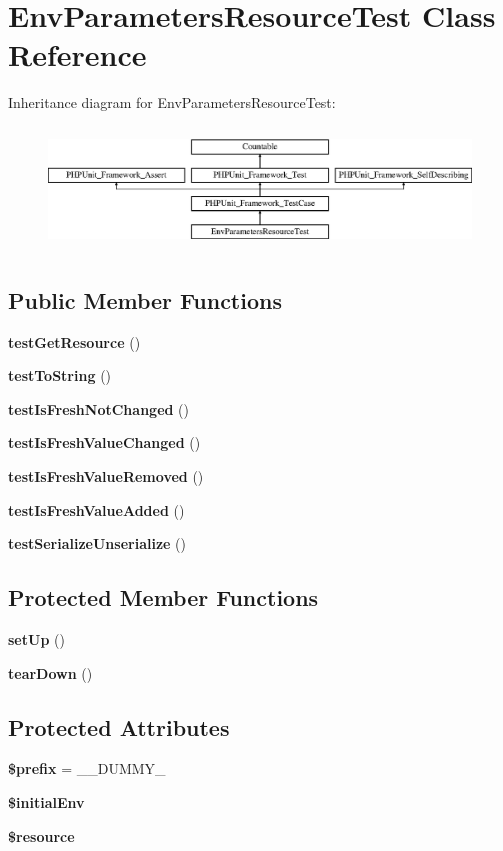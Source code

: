 \section{Env\+Parameters\+Resource\+Test Class Reference}
\label{class_symfony_1_1_component_1_1_http_kernel_1_1_tests_1_1_config_1_1_env_parameters_resource_test}
Inheritance diagram for Env\+Parameters\+Resource\+Test\+:\begin{figure}[H]
\begin{center}
\leavevmode
\includegraphics[height=3.303835cm]{class_symfony_1_1_component_1_1_http_kernel_1_1_tests_1_1_config_1_1_env_parameters_resource_test}
\end{center}
\end{figure}
\subsection*{Public Member Functions}
\begin{DoxyCompactItemize}
\item 
{\bf test\+Get\+Resource} ()
\item 
{\bf test\+To\+String} ()
\item 
{\bf test\+Is\+Fresh\+Not\+Changed} ()
\item 
{\bf test\+Is\+Fresh\+Value\+Changed} ()
\item 
{\bf test\+Is\+Fresh\+Value\+Removed} ()
\item 
{\bf test\+Is\+Fresh\+Value\+Added} ()
\item 
{\bf test\+Serialize\+Unserialize} ()
\end{DoxyCompactItemize}
\subsection*{Protected Member Functions}
\begin{DoxyCompactItemize}
\item 
{\bf set\+Up} ()
\item 
{\bf tear\+Down} ()
\end{DoxyCompactItemize}
\subsection*{Protected Attributes}
\begin{DoxyCompactItemize}
\item 
{\bf \$prefix} = \textquotesingle{}\+\_\+\+\_\+\+D\+U\+M\+M\+Y\+\_\+\textquotesingle{}
\item 
{\bf \$initial\+Env}
\item 
{\bf \$resource}
\end{DoxyCompactItemize}

